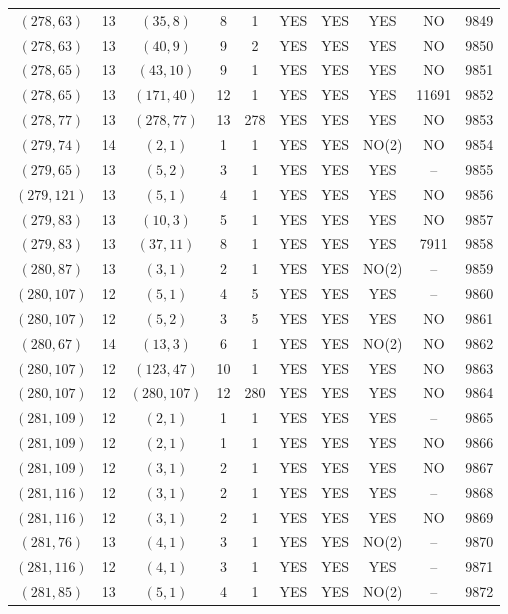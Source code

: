 \begin{longtable}{|c|c|c|c|c|c|c|c|c|c|}
$(278, 63)$ & 13 & $(35, 8)$ & 8 & 1 & YES & YES & YES & NO & 9849\\
$(278, 63)$ & 13 & $(40, 9)$ & 9 & 2 & YES & YES & YES & NO & 9850\\
$(278, 65)$ & 13 & $(43, 10)$ & 9 & 1 & YES & YES & YES & NO & 9851\\
$(278, 65)$ & 13 & $(171, 40)$ & 12 & 1 & YES & YES & YES & 11691 & 9852\\
$(278, 77)$ & 13 & $(278, 77)$ & 13 & 278 & YES & YES & YES & NO & 9853\\
$(279, 74)$ & 14 & $(2, 1)$ & 1 & 1 & YES & YES & NO(2) & NO & 9854\\
$(279, 65)$ & 13 & $(5, 2)$ & 3 & 1 & YES & YES & YES & -- & 9855\\
$(279, 121)$ & 13 & $(5, 1)$ & 4 & 1 & YES & YES & YES & NO & 9856\\
$(279, 83)$ & 13 & $(10, 3)$ & 5 & 1 & YES & YES & YES & NO & 9857\\
$(279, 83)$ & 13 & $(37, 11)$ & 8 & 1 & YES & YES & YES & 7911 & 9858\\
$(280, 87)$ & 13 & $(3, 1)$ & 2 & 1 & YES & YES & NO(2) & -- & 9859\\
$(280, 107)$ & 12 & $(5, 1)$ & 4 & 5 & YES & YES & YES & -- & 9860\\
$(280, 107)$ & 12 & $(5, 2)$ & 3 & 5 & YES & YES & YES & NO & 9861\\
$(280, 67)$ & 14 & $(13, 3)$ & 6 & 1 & YES & YES & NO(2) & NO & 9862\\
$(280, 107)$ & 12 & $(123, 47)$ & 10 & 1 & YES & YES & YES & NO & 9863\\
$(280, 107)$ & 12 & $(280, 107)$ & 12 & 280 & YES & YES & YES & NO & 9864\\
$(281, 109)$ & 12 & $(2, 1)$ & 1 & 1 & YES & YES & YES & -- & 9865\\
$(281, 109)$ & 12 & $(2, 1)$ & 1 & 1 & YES & YES & YES & NO & 9866\\
$(281, 109)$ & 12 & $(3, 1)$ & 2 & 1 & YES & YES & YES & NO & 9867\\
$(281, 116)$ & 12 & $(3, 1)$ & 2 & 1 & YES & YES & YES & -- & 9868\\
$(281, 116)$ & 12 & $(3, 1)$ & 2 & 1 & YES & YES & YES & NO & 9869\\
$(281, 76)$ & 13 & $(4, 1)$ & 3 & 1 & YES & YES & NO(2) & -- & 9870\\
$(281, 116)$ & 12 & $(4, 1)$ & 3 & 1 & YES & YES & YES & -- & 9871\\
$(281, 85)$ & 13 & $(5, 1)$ & 4 & 1 & YES & YES & NO(2) & -- & 9872\\

\end{longtable}
